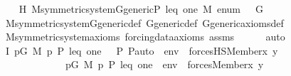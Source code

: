 \begin{isabellebody}
\ \ \isamarkupfalse%
\ H{\isacharcolon}{\kern0pt}\ {\isachardoublequoteopen}M{\isacharunderscore}{\kern0pt}symmetric{\isacharunderscore}{\kern0pt}system{\isacharunderscore}{\kern0pt}G{\isacharunderscore}{\kern0pt}generic{\isacharparenleft}{\kern0pt}P{\isacharcomma}{\kern0pt}\ leq{\isacharcomma}{\kern0pt}\ one{\isacharcomma}{\kern0pt}\ M{\isacharcomma}{\kern0pt}\ enum{\isacharcomma}{\kern0pt}\ {\isasymG}{\isacharcomma}{\kern0pt}\ {\isasymF}{\isacharcomma}{\kern0pt}\ G{\isacharparenright}{\kern0pt}{\isachardoublequoteclose}\isanewline
\ \ \ \ \isamarkupfalse%
\ M{\isacharunderscore}{\kern0pt}symmetric{\isacharunderscore}{\kern0pt}system{\isacharunderscore}{\kern0pt}G{\isacharunderscore}{\kern0pt}generic{\isacharunderscore}{\kern0pt}def\ G{\isacharunderscore}{\kern0pt}generic{\isacharunderscore}{\kern0pt}def\ G{\isacharunderscore}{\kern0pt}generic{\isacharunderscore}{\kern0pt}axioms{\isacharunderscore}{\kern0pt}def\isanewline
\ \ \ \ \isamarkupfalse%
\ M{\isacharunderscore}{\kern0pt}symmetric{\isacharunderscore}{\kern0pt}system{\isacharunderscore}{\kern0pt}axioms\ forcing{\isacharunderscore}{\kern0pt}data{\isacharunderscore}{\kern0pt}axioms\ assms\isanewline
\ \ \ \ \isamarkupfalse%
\ auto\isanewline
\isanewline
\ \ \isamarkupfalse%
\ I{}{\isacharcolon}{\kern0pt}\ {\isachardoublequoteopen}{\isacharparenleft}{\kern0pt}{\isasymexists}p{\isasymin}G{\isachardot}{\kern0pt}\ M{\isacharcomma}{\kern0pt}\ {\isacharbrackleft}{\kern0pt}p{\isacharcomma}{\kern0pt}\ P{\isacharcomma}{\kern0pt}\ leq{\isacharcomma}{\kern0pt}\ one{\isacharcomma}{\kern0pt}\ {\isasymlangle}{\isasymF}{\isacharcomma}{\kern0pt}\ {\isasymG}{\isacharcomma}{\kern0pt}\ P{\isacharcomma}{\kern0pt}\ P{\isacharunderscore}{\kern0pt}auto{\isasymrangle}{\isacharbrackright}{\kern0pt}\ {\isacharat}{\kern0pt}\ env\ {\isasymTurnstile}\ forcesHS{\isacharparenleft}{\kern0pt}Member{\isacharparenleft}{\kern0pt}x{\isacharcomma}{\kern0pt}\ y{\isacharparenright}{\kern0pt}{\isacharparenright}{\kern0pt}{\isacharparenright}{\kern0pt}\ {\isasymlongleftrightarrow}\ \isanewline
\ \ \ \ \ \ \ \ \ \ \ \ \ {\isacharparenleft}{\kern0pt}{\isasymexists}p{\isasymin}G{\isachardot}{\kern0pt}\ M{\isacharcomma}{\kern0pt}\ {\isacharbrackleft}{\kern0pt}p{\isacharcomma}{\kern0pt}\ P{\isacharcomma}{\kern0pt}\ leq{\isacharcomma}{\kern0pt}\ one{\isacharbrackright}{\kern0pt}\ {\isacharat}{\kern0pt}\ env\ {\isasymTurnstile}\ forces{\isacharparenleft}{\kern0pt}Member{\isacharparenleft}{\kern0pt}x{\isacharcomma}{\kern0pt}\ y{\isacharparenright}{\kern0pt}{\isacharparenright}{\kern0pt}{\isacharparenright}{\kern0pt}{\isachardoublequoteclose}\ \isanewline

\end{isabellebody}
